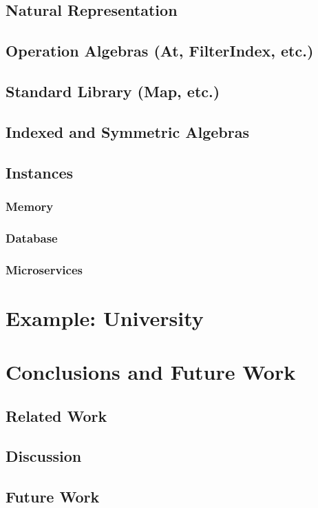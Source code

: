 \documentclass{report}
\begin{document}
\section{Natural Representation}
\section{Operation Algebras (At, FilterIndex, etc.)}
\section{Standard Library (Map, etc.)}
\section{Indexed and Symmetric Algebras}
\section{Instances}
\subsection{Memory}
\subsection{Database}
\subsection{Microservices}

\chapter{Example: University}

\chapter{Conclusions and Future Work}
\section{Related Work}
\section{Discussion}
\section{Future Work}
\end{document}
